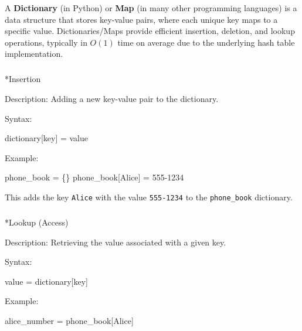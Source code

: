 \documentclass[
  letterpaper,
  DIV=11,
  numbers=noendperiod]{scrreprt}
\makeatletter
\let\oldsubparagraph\subparagraph
\renewcommand{\subparagraph}{
    \@ifstar
      \xxxSubParagraphStar
      \xxxSubParagraphNoStar
  }
\newcommand{\xxxSubParagraphStar}[1]{\oldsubparagraph*{#1}\mbox{}}
\newcommand{\xxxSubParagraphNoStar}[1]{\oldsubparagraph{#1}\mbox{}}
\newenvironment{Shaded}{\begin{snugshade}}{\end{snugshade}}
\newcommand{\NormalTok}[1]{\textcolor[rgb]{0.00,0.23,0.31}{#1}}
\makeatother
\begin{document}
A \textbf{Dictionary} (in Python) or \textbf{Map} (in many other
programming languages) is a data structure that stores key-value pairs,
where each unique key maps to a specific value. Dictionaries/Maps
provide efficient insertion, deletion, and lookup operations, typically
in \(O(1)\) time on average due to the underlying hash table
implementation.

\subparagraph*{Insertion}\label{insertion}

Description: Adding a new key-value pair to the dictionary.

Syntax:

\begin{Shaded}
\begin{Highlighting}[]
\NormalTok{dictionary[key] = value}
\end{Highlighting}
\end{Shaded}

Example:

\begin{Shaded}
\begin{Highlighting}[]
\NormalTok{phone\_book = \{\}}
\NormalTok{phone\_book[\textquotesingle{}Alice\textquotesingle{}] = \textquotesingle{}555{-}1234\textquotesingle{}}
\end{Highlighting}
\end{Shaded}

This adds the key \texttt{\textquotesingle{}Alice\textquotesingle{}}
with the value \texttt{\textquotesingle{}555-1234\textquotesingle{}} to
the \texttt{phone\_book} dictionary.

\subparagraph*{Lookup (Access)}\label{lookup-access}

Description: Retrieving the value associated with a given key.

Syntax:

\begin{Shaded}
\begin{Highlighting}[]
\NormalTok{value = dictionary[key]}
\end{Highlighting}
\end{Shaded}

Example:

\begin{Shaded}
\begin{Highlighting}[]
\NormalTok{alice\_number = phone\_book[\textquotesingle{}Alice\textquotesingle{}]}
\end{Highlighting}
\end{Shaded}
\end{document}
